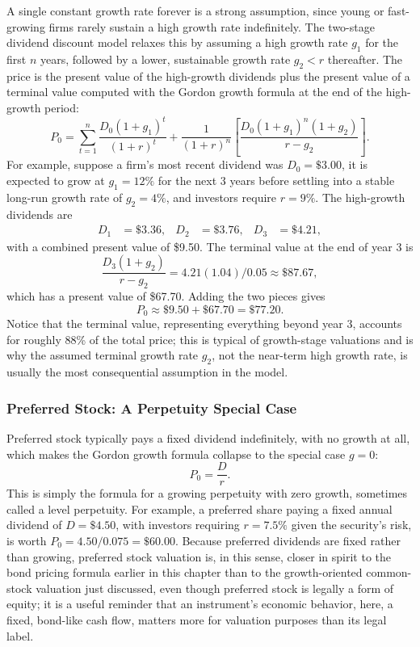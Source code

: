 \documentclass[../ai_in_finance]{subfiles}
\begin{document}
A single constant growth rate forever is a strong assumption, since young or fast-growing firms rarely sustain a high growth rate indefinitely. The two-stage dividend discount model relaxes this by assuming a high growth rate $g_1$ for the first $n$ years, followed by a lower, sustainable growth rate $g_2 < r$ thereafter. The price is the present value of the high-growth dividends plus the present value of a terminal value computed with the Gordon growth formula at the end of the high-growth period:
\begin{equation*}
P_0 = \sum_{t=1}^{n} \frac{D_0(1+g_1)^t}{(1+r)^t} + \frac{1}{(1+r)^n}\left[\frac{D_0(1+g_1)^n(1+g_2)}{r-g_2}\right].
\end{equation*}
For example, suppose a firm's most recent dividend was $D_0 = \$3.00$, it is expected to grow at $g_1=12\%$ for the next 3 years before settling into a stable long-run growth rate of $g_2=4\%$, and investors require $r=9\%$. The high-growth dividends are
\begin{align*}
D_1 &= \$3.36, & D_2 &= \$3.76, & D_3 &= \$4.21,
\end{align*}
with a combined present value of \$9.50. The terminal value at the end of year 3 is
\begin{equation*}
\frac{D_3(1+g_2)}{r-g_2} = 4.21(1.04)/0.05 \approx \$87.67,
\end{equation*}
which has a present value of \$67.70. Adding the two pieces gives
\begin{equation*}
P_0 \approx \$9.50 + \$67.70 = \$77.20.
\end{equation*}
Notice that the terminal value, representing everything beyond year 3, accounts for roughly 88\% of the total price; this is typical of growth-stage valuations and is why the assumed terminal growth rate $g_2$, not the near-term high growth rate, is usually the most consequential assumption in the model.

\subsubsection*{Preferred Stock: A Perpetuity Special Case}

Preferred stock typically pays a fixed dividend indefinitely, with no growth at all, which makes the Gordon growth formula collapse to the special case $g=0$:
\begin{equation*}
P_0 = \frac{D}{r}.
\end{equation*}
This is simply the formula for a growing perpetuity with zero growth, sometimes called a level perpetuity. For example, a preferred share paying a fixed annual dividend of $D=\$4.50$, with investors requiring $r=7.5\%$ given the security's risk, is worth $P_0 = 4.50/0.075 = \$60.00$. Because preferred dividends are fixed rather than growing, preferred stock valuation is, in this sense, closer in spirit to the bond pricing formula earlier in this chapter than to the growth-oriented common-stock valuation just discussed, even though preferred stock is legally a form of equity; it is a useful reminder that an instrument's economic behavior, here, a fixed, bond-like cash flow, matters more for valuation purposes than its legal label.
\end{document}
